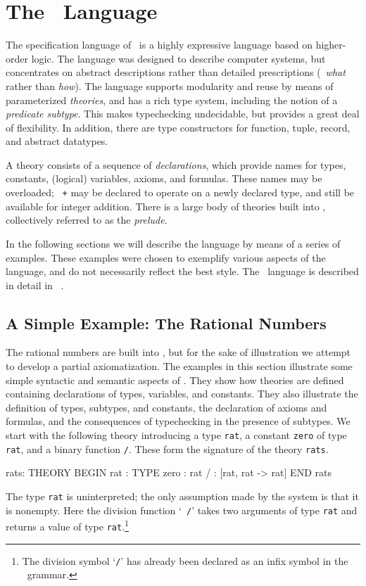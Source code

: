 
\def\stt{\smaller\tt}

\section{The \pvs\ Language}

The specification language of \pvs\ is a highly expressive language
based on higher-order logic.  The language was designed to describe
computer systems, but concentrates on abstract descriptions rather than
detailed prescriptions (\ie\ {\em what\/} rather than {\em how\/}).  The
language supports modularity and reuse by means of parameterized {\em
theories\/}, and has a rich type system, including the notion of a
{\em predicate subtype\/}.  This makes typechecking undecidable, but
provides a great deal of flexibility.  In addition, there are type
constructors for function, tuple, record, and abstract datatypes.

A theory consists of a sequence of {\em declarations\/}, which provide
names for types, constants, (logical) variables, axioms, and formulas.
These names may be overloaded; \eg\ {\tt +} may be declared to operate
on a newly declared type, and still be available for integer addition.
There is a large body of theories built into \pvs, collectively
referred to as the {\em prelude\/}.

In the following sections we will describe the language by means of a
series of examples.  These examples were chosen to exemplify various
aspects of the language, and do not necessarily reflect the best style.
The \pvs\ language is described in detail in ~\cite{PVS:language}.


\subsection{A Simple Example: The Rational Numbers}

The rational numbers are built into \pvs, but for the sake of
illustration we attempt to develop a partial axiomatization.  The
examples in this section illustrate some simple syntactic and semantic
aspects of \pvs\@.  They show how theories are defined containing
declarations of types, variables, and constants.  They also illustrate
the definition of types, subtypes, and constants, the declaration of
axioms and formulas, and the consequences of typechecking in the
presence of subtypes.  We start with the following theory introducing a
type {\stt rat}, a constant {\stt zero} of type {\stt rat}, and a binary
function {\tt /}.  These form the signature of the theory {\stt rats}.
\begin{pvsexample}
  rats: THEORY
   BEGIN
    rat : TYPE
    zero : rat
    / : [rat, rat -> rat]
   END rats
\end{pvsexample}
%
The type {\stt rat} is uninterpreted; the only assumption made by the
system is that it is nonempty.  Here the division function `{\tt
/}' takes two arguments of type {\stt rat} and returns a value of type
{\stt rat}.\footnote{The division symbol `{\tt /}' has already been
declared as an infix symbol in the \pvs\ grammar.}

